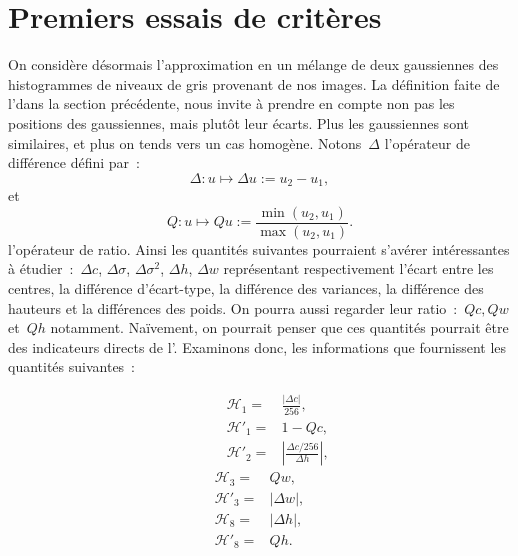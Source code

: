 \documentclass[main.tex]{subfiles}
\begin{document}
\section{Premiers essais de critères\label{sec:premier_essai_critere}}
On considère désormais l'approximation en un mélange de deux gaussiennes des histogrammes de niveaux de gris provenant de nos images. La définition faite de l'\hetero dans la section précédente, nous invite à prendre en compte non pas les positions des gaussiennes, mais plutôt leur écarts. Plus les gaussiennes sont similaires, et plus on tends vers un cas homogène. 
Notons~$\Delta$ l'opérateur de différence défini par~:
\begin{equation}
\label{eq:operateur_delta_gaussienne}
\Delta :  u \longmapsto \Delta u := u_2 - u_1,
\end{equation}
et
\begin{equation}
\label{eq:operateur_quotient_gaussienne}
Q : u \longmapsto Qu := \dfrac{ \min( u_2 , u_1) }{ \max( u_2 , u_1)  }.
\end{equation}
l'opérateur de ratio. 
Ainsi les quantités suivantes pourraient s'avérer intéressantes à étudier~:~$\Delta c$, $\Delta \sigma$,  $\Delta \sigma^2$, $\Delta h$, $\Delta w$ représentant respectivement l'écart entre les centres, la différence d'écart-type, la différence des variances, la différence des hauteurs et la différences des poids. On pourra aussi regarder leur ratio~:~$Qc, Qw$ et~$Qh$ notamment. Naïvement, on pourrait penser que ces quantités pourrait être des indicateurs directs de l'\hetero. 
Examinons donc, les informations que fournissent les quantités suivantes~: %
\begin{multicols}{2}[\setlength{\columnseprule}{0.4pt}]%
\vspace*{-15mm} %
\leqnomode
\begin{align}
\quad &&\mathcal{H}_1 =& \frac{|\Delta c |}{256}, \label{eq:H1}\\
&&\mathcal{H}'_1 =& 1-Qc, \\ %
&&\mathcal{H}'_2 =& \left| \frac{\Delta c / 256 }{\Delta h}\right|,
\end{align}
\reqnomode
\begin{align}
\mathcal{H}_3 =& Qw, \\ %
\mathcal{H}'_3 =& |\Delta w|, \\
\mathcal{H}_8 =& |\Delta h|, \\
\mathcal{H}'_8 =& Qh.  \label{eq:H8bis}  
\end{align}%
\end{multicols}
\end{document}
